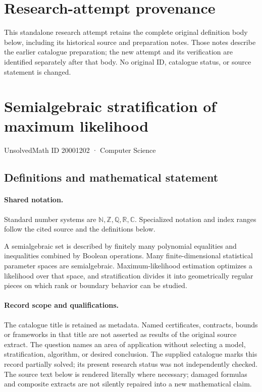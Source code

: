 \documentclass[11pt]{article}
\begin{document}
\section*{Research-attempt provenance}
This standalone research attempt retains the complete original definition body below,
including its historical source and preparation notes. Those notes describe the
earlier catalogue preparation; the new attempt and its verification are identified
separately after that body. No original ID, catalogue status, or source statement is changed.

\section{Semialgebraic stratification of maximum likelihood}\label{20001202}
{\small UnsolvedMath ID 20001202 · Computer Science}
\subsection{Definitions and mathematical statement}

\paragraph{Shared notation.}Standard number systems are $\mathbb N,\mathbb Z,\mathbb Q,\mathbb R,\mathbb C$. Specialized notation and index ranges follow the cited source and the definitions below.


A semialgebraic set is described by finitely many polynomial equalities and inequalities combined by Boolean operations. Many finite-dimensional statistical parameter spaces are semialgebraic. Maximum-likelihood estimation optimizes a likelihood over that space, and stratification divides it into geometrically regular pieces on which rank or boundary behavior can be studied.
\paragraph{Record scope and qualifications.}
The catalogue title is retained as metadata. Named certificates, contracts, bounds or frameworks in that title are not asserted as results of the original source extract.
The question names an area of application without selecting a model, stratification, algorithm, or desired conclusion. The supplied catalogue marks this record partially solved; its present research status was not independently checked.
The source text below is rendered literally where necessary; damaged formulas and composite extracts are not silently repaired into a new mathematical claim.
\end{document}
